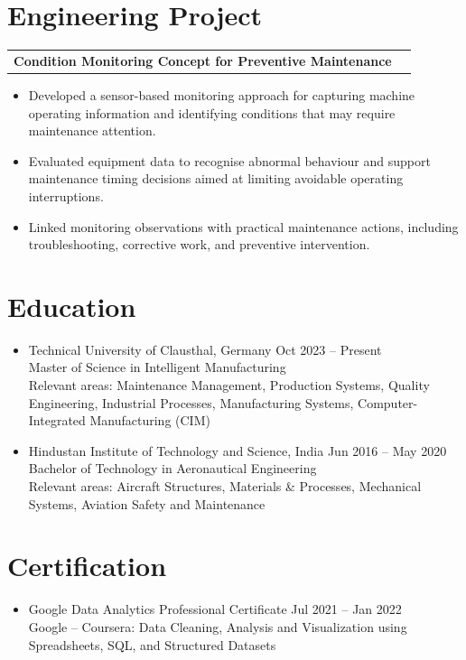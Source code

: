 \documentclass[a4paper,10pt]{article}
\makeatletter
\newcommand{\resumeProject}[2]{
\begin{tabularx}{\textwidth}{@{}X r@{}}
\textbf{#1} & \textit{#2}
\end{tabularx}
\vspace{1pt}
}
\makeatother
\begin{document}
\newpage

\section*{Engineering Project}

\resumeProject{Condition Monitoring Concept for Preventive Maintenance}{}
\begin{itemize}
\item Developed a sensor-based monitoring approach for capturing machine operating information and identifying conditions that may require maintenance attention.
\item Evaluated equipment data to recognise abnormal behaviour and support maintenance timing decisions aimed at limiting avoidable operating interruptions.
\item Linked monitoring observations with practical maintenance actions, including troubleshooting, corrective work, and preventive intervention.
\end{itemize}

\section*{Education}

\begin{itemize}
\item Technical University of Clausthal, Germany \hfill Oct 2023 -- Present\\
Master of Science in Intelligent Manufacturing\\
Relevant areas: Maintenance Management, Production Systems, Quality Engineering, Industrial Processes, Manufacturing Systems, Computer-Integrated Manufacturing (CIM)
\item Hindustan Institute of Technology and Science, India \hfill Jun 2016 -- May 2020\\
Bachelor of Technology in Aeronautical Engineering\\
Relevant areas: Aircraft Structures, Materials \& Processes, Mechanical Systems, Aviation Safety and Maintenance
\end{itemize}

\section*{Certification}

\begin{itemize}
\item Google Data Analytics Professional Certificate \hfill Jul 2021 -- Jan 2022\\
Google -- Coursera: Data Cleaning, Analysis and Visualization using Spreadsheets, SQL, and Structured Datasets
\end{itemize}
\end{document}
